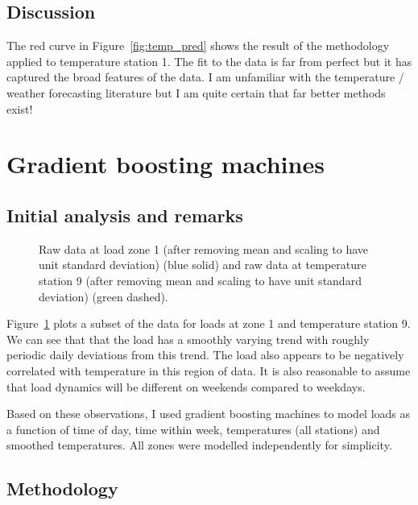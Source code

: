 \documentclass[preprint,authoryear,12pt]{elsarticle}
\begin{document}
\subsection{Discussion}

The red curve in Figure~\ref{fig:temp_pred} shows the result of the methodology applied to temperature station 1.
The fit to the data is far from perfect but it has captured the broad features of the data.
I am unfamiliar with the temperature / weather forecasting literature but I am quite certain that far better methods exist!

\section{Gradient boosting machines}

\label{sec:gbm}

\subsection{Initial analysis and remarks}

\label{sec:gbm_init_anal}

\begin{figure}[ht]
  \begin{center}
    
  \end{center}
  \caption{Raw data at load zone 1 (after removing mean and scaling to have unit standard deviation) (blue solid) and raw data at temperature station 9 (after removing mean and scaling to have unit standard deviation) (green dashed).}
  \label{fig:load_temp}
\end{figure}

Figure~\ref{fig:load_temp} plots a subset of the data for loads at zone 1 and temperature station 9.
We can see that that the load has a smoothly varying trend with roughly periodic daily deviations from this trend.
The load also appears to be negatively correlated with temperature in this region of data.
It is also reasonable to assume that load dynamics will be different on weekends compared to weekdays.

Based on these observations, I used gradient boosting machines to model loads as a function of time of day, time within week, temperatures (all stations) and smoothed temperatures.
All zones were modelled independently for simplicity.

\subsection{Methodology}
\end{document}
